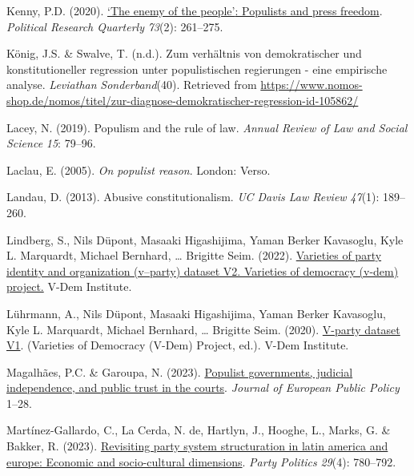 \documentclass[
  abstract]{article}
\newlength{\cslhangindent}
\newlength{\cslentryspacingunit} %
\newenvironment{CSLReferences}[2] %
 {%
  \setlength{\parindent}{0pt}
  \ifodd #1
  \let\oldpar\par
  \def\par{\hangindent=\cslhangindent\oldpar}
  \fi
  \setlength{\parskip}{#2\cslentryspacingunit}
 }%
 {}
\begin{document}
\begin{CSLReferences}{1}{0}
\leavevmode{}%
Kenny, P.D. (2020).
\href{https://doi.org/10.1177/1065912918824038}{{`The enemy of the
people'}: Populists and press freedom}. \emph{Political Research
Quarterly} \emph{73}(2): 261--275.

\leavevmode{}%
König, J.S. \& Swalve, T. (n.d.). Zum verh{ä}ltnis von demokratischer
und konstitutioneller regression unter populistischen regierungen - eine
empirische analyse. \emph{Leviathan} \emph{Sonderband}(40). Retrieved
from
\url{https://www.nomos-shop.de/nomos/titel/zur-diagnose-demokratischer-regression-id-105862/}

\leavevmode{}%
Lacey, N. (2019). Populism and the rule of law. \emph{Annual Review of
Law and Social Science} \emph{15}: 79--96.

\leavevmode{}%
Laclau, E. (2005). \emph{On populist reason}. London: Verso.

\leavevmode{}%
Landau, D. (2013). Abusive constitutionalism. \emph{UC Davis Law Review}
\emph{47}(1): 189--260.

\leavevmode{}%
Lindberg, S., Nils Düpont, Masaaki Higashijima, Yaman Berker Kavasoglu,
Kyle L. Marquardt, Michael Bernhard, \ldots{} Brigitte Seim. (2022).
\href{https://doi.org/10.23696/VPARTYDSV2}{Varieties of party identity
and organization (v--party) dataset V2. Varieties of democracy (v-dem)
project.} {V-Dem Institute}.

\leavevmode{}%
Lührmann, A., Nils Düpont, Masaaki Higashijima, Yaman Berker Kavasoglu,
Kyle L. Marquardt, Michael Bernhard, \ldots{} Brigitte Seim. (2020).
\href{https://doi.org/10.23696/VPARTYDSV1}{V-party dataset V1}.
(Varieties of Democracy (V-Dem) Project, ed.). {V-Dem Institute}.

\leavevmode{}%
Magalhães, P.C. \& Garoupa, N. (2023).
\href{https://doi.org/10.1080/13501763.2023.2235386}{Populist
governments, judicial independence, and public trust in the courts}.
\emph{Journal of European Public Policy} 1--28.

\leavevmode{}%
Martínez-Gallardo, C., La Cerda, N. de, Hartlyn, J., Hooghe, L., Marks,
G. \& Bakker, R. (2023).
\href{https://doi.org/10.1177/13540688221090604}{Revisiting party system
structuration in latin america and europe: Economic and socio-cultural
dimensions}. \emph{Party Politics} \emph{29}(4): 780--792.


\end{CSLReferences}
\end{document}
